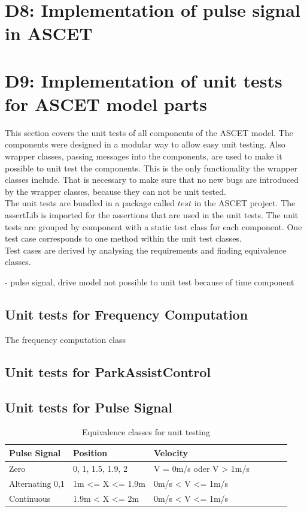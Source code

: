 \chapter{D8: Implementation of pulse signal in ASCET}\label{cha:D8}

\chapter{D9: Implementation of unit tests for ASCET model parts}\label{cha:D9}
This section covers the unit tests of all components of the ASCET model.
The components were designed in a modular way to allow easy unit testing.
Also wrapper classes, passing messages into the components, are used to make it possible to unit test the components.
This is the only functionality the wrapper classes include.
That is necessary to make sure that no new bugs are introduced by the wrapper classes, because they can not be unit tested.\\
The unit tests are bundled in a package called $test$ in the ASCET project. The assertLib is imported for the assertions that are used in the unit tests. The unit tests are grouped by component with a static test class for each component. One test case corresponds to one method within the unit test classes.\\

Test cases are derived by analysing the requirements and finding equivalence classes.

- pulse signal, drive model not possible to unit test because of time component

\section{Unit tests for Frequency Computation}

The frequency computation class 


\section{Unit tests for ParkAssistControl}

\section{Unit tests for Pulse Signal}

\begin{table}[H]
\centering
\caption{Equivalence classes for unit testing}
\begin{adjustbox}{width=1\textwidth, center=\textwidth}
\renewcommand{\arraystretch}{1}
\begin{tabular}{lllllll}
\textbf{Pulse Signal} & \textbf{Position} & \textbf{Velocity}\\\hline
Zero & {0, 1, 1.5, 1.9, 2} & V = 0m/s oder V > 1m/s\\
Alternating 0,1 & 1m <= X <= 1.9m  & 0m/s < V <= 1m/s \\
Continuous & 1.9m < X <= 2m  & 0m/s < V <= 1m/s \\
\end{tabular}
\end{adjustbox}
\end{table}

